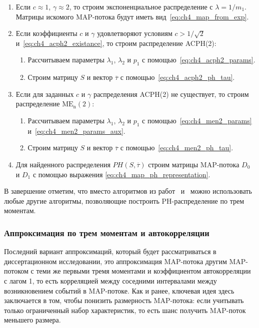 \begin{enumerate}
    \item Если $c \approx 1$, $\gamma \approx 2$, то строим экспоненциальное распределение с $\lambda = 1/m_1$. Матрицы искомого MAP-потока будут иметь вид~\eqref{eq:ch4_map_from_exp}.
    \item Если коэффициенты $c$ и $\gamma$ удовлетворяют условиям $c > 1/\sqrt{2}$ и~\eqref{eq:ch4_acph2_existance}, то строим распределение ACPH(2):
    \begin{enumerate}
        \item Рассчитываем параметры $\lambda_1$, $\lambda_2$ и $p_1$ с помощью~\eqref{eq:ch4_acph2_params}.
        \item Строим матрицу $S$ и вектор $\overline{\tau}$ с помощью~\eqref{eq:ch4_acph2_ph_tau}.
    \end{enumerate}
    \item Если для заданных $c$ и $\gamma$ распределения ACPH(2) не существует, то строим распределение $\text{ME}_\text{n}(2)$:
    \begin{enumerate}
        \item Рассчитываем параметры $\lambda_1$, $\lambda_2$ и $p_1$ с помощью~\eqref{eq:ch4_men2_params} и~\eqref{eq:ch4_men2_params_aux}.
        \item Строим матрицу $S$ и вектор $\overline{\tau}$ с помощью~\eqref{eq:ch4_men2_ph_tau}.
    \end{enumerate}
    \item Для найденного распределения $PH(S, \overline{\tau})$ строим матрицы MAP-потока $D_0$ и $D_1$ с помощью выражения \eqref{eq:ch4_map_ph_representation}.
\end{enumerate}

В завершение отметим, что вместо алгоритмов из работ~\cite{Telek2003} и~\cite{Johnson1989} можно использовать любые другие алгоритмы, позволяющие построить PH-распределение по трем моментам.



\subsubsection{Аппроксимация по трем моментам и автокорреляции}\label{sec:ch4_approx_m3_lag1}

Последний вариант аппроксимаций, который будет рассматриваться в диссертационном исследовании, это аппроксимация MAP-потока другим MAP-потоком с теми же первыми тремя моментами и коэффициентом автокорреляции с лагом 1, то есть корреляцией между соседними интервалами между возникновением событий в MAP-потоке. Как и ранее, ключевая идея здесь заключается в том, чтобы понизить размерность MAP-потока: если учитывать только ограниченный набор характеристик, то есть шанс получить MAP-поток меньшего размера.

